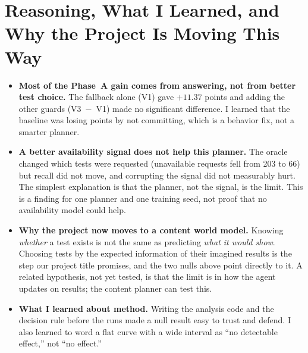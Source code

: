 \documentclass[11pt,letterpaper]{article}
\begin{document}
\section{Reasoning, What I Learned, and Why the Project Is Moving This Way}
\begin{itemize}
  \item \textbf{Most of the Phase~A gain comes from answering, not from better test choice.} The fallback alone (V1) gave $+11.37$ points and adding the other guards (V3~$-$~V1) made no significant difference. I learned that the baseline was losing points by not committing, which is a behavior fix, not a smarter planner.
  \item \textbf{A better availability signal does not help this planner.} The oracle changed which tests were requested (unavailable requests fell from 203 to 66) but recall did not move, and corrupting the signal did not measurably hurt. The simplest explanation is that the planner, not the signal, is the limit. This is a finding for one planner and one training seed, not proof that no availability model could help.
  \item \textbf{Why the project now moves to a content world model.} Knowing \emph{whether} a test exists is not the same as predicting \emph{what it would show}. Choosing tests by the expected information of their imagined results is the step our project title promises, and the two nulls above point directly to it. A related hypothesis, not yet tested, is that the limit is in how the agent updates on results; the content planner can test this.
  \item \textbf{What I learned about method.} Writing the analysis code and the decision rule before the runs made a null result easy to trust and defend. I also learned to word a flat curve with a wide interval as ``no detectable effect,'' not ``no effect.''
\end{itemize}
\end{document}
